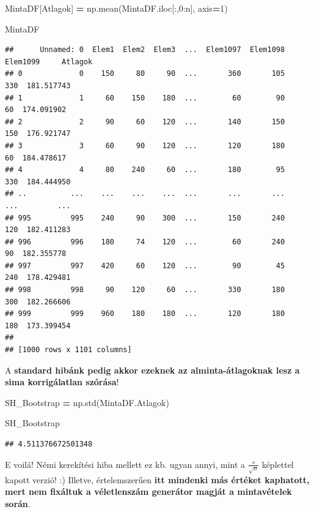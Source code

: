 \documentclass[
]{book}
\newenvironment{Shaded}{\begin{snugshade}}{\end{snugshade}}
\newcommand{\DecValTok}[1]{\textcolor[rgb]{0.00,0.00,0.81}{#1}}
\newcommand{\NormalTok}[1]{#1}
\newcommand{\OperatorTok}[1]{\textcolor[rgb]{0.81,0.36,0.00}{\textbf{#1}}}
\newcommand{\StringTok}[1]{\textcolor[rgb]{0.31,0.60,0.02}{#1}}
\begin{document}
\begin{Shaded}
\begin{Highlighting}[]
\NormalTok{MintaDF[}\StringTok{\textquotesingle{}Atlagok\textquotesingle{}}\NormalTok{] }\OperatorTok{=}\NormalTok{ np.mean(MintaDF.iloc[:,}\DecValTok{0}\NormalTok{:n], axis}\OperatorTok{=}\DecValTok{1}\NormalTok{)}

\NormalTok{MintaDF}
\end{Highlighting}
\end{Shaded}

\begin{verbatim}
##      Unnamed: 0  Elem1  Elem2  Elem3  ...  Elem1097  Elem1098  Elem1099     Atlagok
## 0             0    150     80     90  ...       360       105       330  181.517743
## 1             1     60    150    180  ...        60        90        60  174.091902
## 2             2     90     60    120  ...       140       150       150  176.921747
## 3             3     60     90    120  ...       120       180        60  184.478617
## 4             4     80    240     60  ...       180        95       330  184.444950
## ..          ...    ...    ...    ...  ...       ...       ...       ...         ...
## 995         995    240     90    300  ...       150       240       120  182.411283
## 996         996    180     74    120  ...        60       240        90  182.355778
## 997         997    420     60    120  ...        90        45       240  178.429481
## 998         998     90    120     60  ...       330       180       300  182.266606
## 999         999    960    180    180  ...       120       180       180  173.399454
## 
## [1000 rows x 1101 columns]
\end{verbatim}

A \textbf{standard hibánk pedig akkor ezeknek az alminta-átlagoknak lesz a sima korrigálatlan szórása}!

\begin{Shaded}
\begin{Highlighting}[]
\NormalTok{SH\_Bootstrap }\OperatorTok{=}\NormalTok{ np.std(MintaDF.Atlagok)}

\NormalTok{SH\_Bootstrap}
\end{Highlighting}
\end{Shaded}

\begin{verbatim}
## 4.511376672501348
\end{verbatim}

E voilá! Némi kerekítési hiba mellett ez kb. ugyan annyi, mint a \(\frac{s}{\sqrt{n}}\) képlettel kapott verzió! :) Illetve, értelemszerűen \textbf{itt mindenki más értéket kaphatott, mert nem fixáltuk a véletlenszám generátor magját a mintavételek során}.
\end{document}
